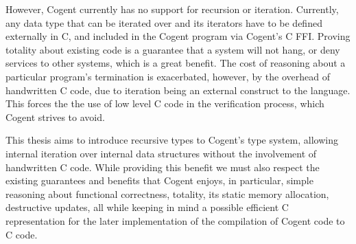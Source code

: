 However, Cogent currently has no support for recursion or iteration.
Currently, any data type that can be iterated over and its iterators have to be defined externally in C,
  and included in the Cogent program via Cogent's C FFI.
Proving totality about existing code is a guarantee that a system will not hang,
  or deny services to other systems, which is a great benefit.
The cost of reasoning about a particular program's termination is exacerbated, however, by the overhead of
 handwritten C code, due to iteration being an external construct to the language.
This forces the the use of low level C code in the verification process, which Cogent strives to avoid.

This thesis aims to introduce recursive types to Cogent's type system, allowing internal iteration over
  internal data structures without the involvement of handwritten C code.
While providing this benefit we must also respect the existing guarantees and benefits that Cogent enjoys,
  in particular, simple reasoning about functional correctness, totality,
  its static memory allocation, destructive updates, all while keeping in mind
  a possible efficient C representation for the later implementation of the compilation of Cogent
  code to C code.
